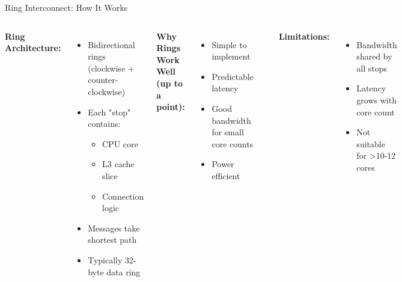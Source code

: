 \documentclass[aspectratio=169,12pt]{beamer}
\begin{document}
\begin{frame}{Ring Interconnect: How It Works}
\begin{columns}[T]
\textbf{Ring Architecture:}
\begin{itemize}
\item Bidirectional rings (clockwise + counter-clockwise)
\item Each "stop" contains:
  \begin{itemize}
  \item CPU core
  \item L3 cache slice
  \item Connection logic
  \end{itemize}
\item Messages take shortest path
\item Typically 32-byte data ring
\end{itemize}

\vspace{0.3cm}
\textbf{Why Rings Work Well (up to a point):}
\begin{itemize}
\item Simple to implement
\item Predictable latency
\item Good bandwidth for small core counts
\item Power efficient
\end{itemize}

\begin{center}
\end{center}

\textbf{Limitations:}
\begin{itemize}
\item Bandwidth shared by all stops
\item Latency grows with core count
\item Not suitable for >10-12 cores
\end{itemize}
\end{columns}
\end{frame}
\end{document}
